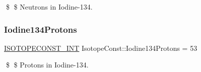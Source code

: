 \$ \$ Neutrons in Iodine-\/134. \mbox{\label{group___isotope_const-_iodine-_i134_gadf0a025073f1e6bf84803a04aab7ed31}} 
\subsubsection{\texorpdfstring{Iodine134\+Protons}{Iodine134Protons}}
{\footnotesize\ttfamily \mbox{\hyperlink{group___isotope_const-_macros_ga5f18360b3e99483a35c32d789e62621c}{I\+S\+O\+T\+O\+P\+E\+C\+O\+N\+S\+T\+\_\+\+I\+NT}} Isotope\+Const\+::\+Iodine134\+Protons = 53}

\$ \$ Protons in Iodine-\/134. 